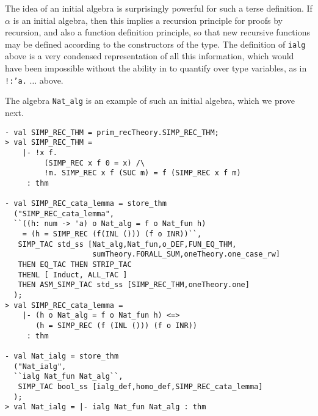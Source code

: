 The idea of an initial algebra is surprisingly powerful for such a terse definition.
If $\alpha$ is an initial algebra, then this implies 
a recursion principle for proofs by recursion, and also
a function definition principle, so that new recursive functions may be defined
according to the constructors of the type. The definition of \texttt{ialg} above is a very 
condensed representation of all this information, which would have been impossible 
without the ability in \HOLW{}
to quantify over type variables, as in \texttt{!:'a.} $\ldots$ above.

The algebra \texttt{Nat\_alg} is an example of such an initial algebra, which we
prove next.
%
%
\begin{session}
\begin{verbatim}
- val SIMP_REC_THM = prim_recTheory.SIMP_REC_THM;
> val SIMP_REC_THM =
    |- !x f.
         (SIMP_REC x f 0 = x) /\
         !m. SIMP_REC x f (SUC m) = f (SIMP_REC x f m)
     : thm

- val SIMP_REC_cata_lemma = store_thm
  ("SIMP_REC_cata_lemma",
  ``((h: num -> 'a) o Nat_alg = f o Nat_fun h)
    = (h = SIMP_REC (f(INL ())) (f o INR))``,
   SIMP_TAC std_ss [Nat_alg,Nat_fun,o_DEF,FUN_EQ_THM,
                    sumTheory.FORALL_SUM,oneTheory.one_case_rw]
   THEN EQ_TAC THEN STRIP_TAC
   THENL [ Induct, ALL_TAC ]
   THEN ASM_SIMP_TAC std_ss [SIMP_REC_THM,oneTheory.one]
  );
> val SIMP_REC_cata_lemma =
    |- (h o Nat_alg = f o Nat_fun h) <=>
       (h = SIMP_REC (f (INL ())) (f o INR))
     : thm

- val Nat_ialg = store_thm
  ("Nat_ialg",
  ``ialg Nat_fun Nat_alg``,
   SIMP_TAC bool_ss [ialg_def,homo_def,SIMP_REC_cata_lemma]
  );
> val Nat_ialg = |- ialg Nat_fun Nat_alg : thm
\end{verbatim}
\end{session}
